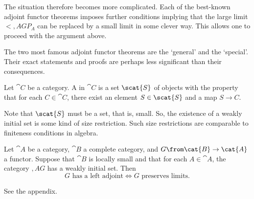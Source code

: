 The situation therefore becomes more complicated.  Each of the best-known
adjoint functor theorems imposes further conditions implying that the large
limit $\lt{\comma{A}{G}} P_A$ can be replaced by a small limit in some
clever way.  This allows one to proceed with the argument above.%
%
%
%

The two most famous adjoint functor theorems are the `general' and the
`special'.  Their exact statements and proofs are perhaps less significant
than their consequences.

\begin{defn}
Let $\cat{C}$ be a category.  A  in $\cat{C}$ is a set $\scat{S}$ of objects with the property
that for each $C \in \cat{C}$, there exist an element $S \in \scat{S}$ and
a map $S \to C$.
\end{defn}
% 
Note that $\scat{S}$ must be a set, that is, small.  So, the existence of a
weakly initial set is some kind of size restriction.  Such size
restrictions are comparable to finiteness conditions in algebra.

\begin{thm}     
\label{thm:gaft}
%
%
%
Let $\cat{A}$ be a category, $\cat{B}$ a complete category, and $G\from
\cat{B} \to \cat{A}$ a functor.  Suppose that $\cat{B}$ is locally small and
that for each $A \in \cat{A}$, the category $\comma{A}{G}$ has a weakly
initial set.  Then
\[
G \text{ has a left adjoint}
\iff
G \text{ preserves limits}.
\]
\end{thm}

\begin{pf}
See the appendix.
\end{pf}

